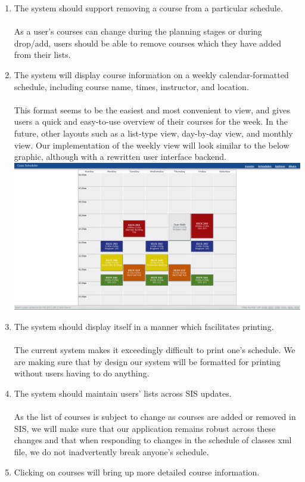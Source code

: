 \documentclass[pdftex,12pt,letter]{article}
\begin{document}
\begin{enumerate}[1.]
\item The system should support removing a course from a particular schedule.\\\\
As a user's courses can change during the planning stages or during drop/add, users should be able to remove courses which they have added from their lists.
\item The system will display course information on a weekly calendar-formatted schedule, including course name, times, instructor, and location.\\\\
This format seems to be the easiest and most convenient to view, and gives users a quick and easy-to-use overview of their courses for the week. In the future, other layouts such as a list-type view, day-by-day view, and monthly view. Our implementation of the weekly view will look similar to the below graphic, although with a rewritten user interface backend.\\
\includegraphics[width=130mm]{main_schedule.png}
\item The system should display itself in a manner which facilitates printing.\\\\
The current system makes it exceedingly difficult to print one's schedule. We are making sure that by design our system will be formatted for printing without users having to do anything.
\item The system should maintain users' lists across SIS updates.\\\\
As the list of courses is subject to change as courses are added or removed in SIS, we will make sure that our application remains robust across these changes and that when responding to changes in the schedule of classes xml file, we do not inadvertently break anyone's schedule.
\item Clicking on courses will bring up more detailed course information.\\\\

\end{enumerate}
\end{document}
